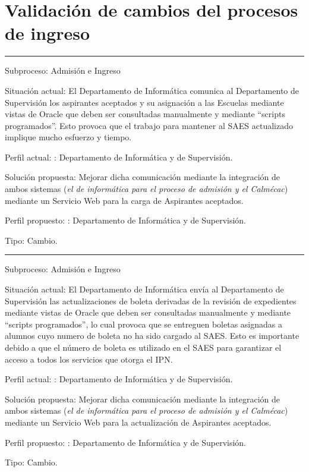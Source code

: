 \section{Validación de cambios del procesos de ingreso}
\label{sec:PF-IN:validacion}

\hrule
\vspace{0.2cm}
\begin{Cdescription}
	\item[Subproceso:] Admisión e Ingreso
	\item[Situación actual:] El Departamento de Informática comunica al Departamento de Supervisión los aspirantes aceptados y su asignación a las Escuelas mediante vistas de Oracle que deben ser consultadas manualmente y mediante ``scripts programados''. Esto provoca que el trabajo para mantener al SAES actualizado implique mucho esfuerzo y tiempo.
	\item[Perfil actual:] : Departamento de Informática y de Supervisión.
	\item[Solución propuesta:] Mejorar dicha comunicación mediante la integración de ambos sistemas ({\em el de informática para el proceso de admisión y el Calmécac}) mediante un Servicio Web para la carga de Aspirantes aceptados.
	\item[Perfil propuesto:] : Departamento de Informática y de Supervisión.
	\item[Tipo:] Cambio.
\end{Cdescription}

\hrule
\vspace{0.2cm}
\begin{Cdescription}
	\item[Subproceso:] Admisión e Ingreso
	\item[Situación actual:] El Departamento de Informática envía al Departamento de Supervisión las actualizaciones de boleta derivadas de la revisión de expedientes mediante vistas de Oracle que deben ser consultadas manualmente y mediante ``scripts programados'', lo cual provoca que se entreguen boletas asignadas a alumnos cuyo numero de boleta no ha sido cargado al SAES. Esto es importante debido a que el número de boleta es utilizado en el SAES para garantizar el acceso a todos los servicios que otorga el IPN.
	\item[Perfil actual:] : Departamento de Informática y de Supervisión.
	\item[Solución propuesta:] Mejorar dicha comunicación mediante la integración de ambos sistemas ({\em el de informática para el proceso de admisión y el Calmécac}) mediante un Servicio Web para la actualización de Aspirantes aceptados.
	\item[Perfil propuesto:] : Departamento de Informática y de Supervisión.
	\item[Tipo:] Cambio.
\end{Cdescription}

